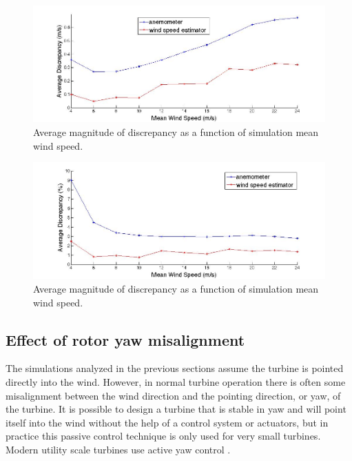 \begin{figure}[htbp]
	\centering
		\includegraphics[width = \linewidth]{Figures/ch2Figures/fig2-18.jpg}
		
	\caption{Average magnitude of discrepancy as a function of simulation mean wind speed.}
	\label{fig2-18}
\end{figure}



\begin{figure}[htbp]
	\centering
		\includegraphics[width = \linewidth]{Figures/ch2Figures/fig2-19.jpg}
		
	\caption{Average magnitude of discrepancy as a function of simulation mean wind speed.}
	\label{fig2-19}
\end{figure}


\subsection{Effect of rotor yaw misalignment}\label{section2-4-2} 

The simulations analyzed in the previous sections assume the turbine is pointed directly into the wind. However, in normal turbine operation there is often some misalignment between the wind direction and the pointing direction, or yaw, of the turbine. It is possible to design a turbine that is stable in yaw and will point itself into the wind without the help of a control system or actuators, but in practice this passive control technique is only used for very small turbines. Modern utility scale turbines use active yaw control \cite{burton2011}.

